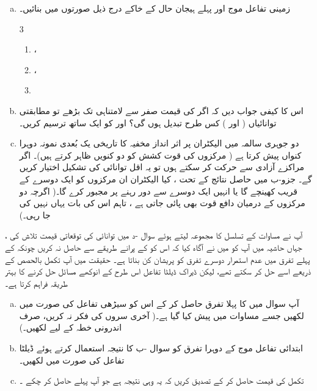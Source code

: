 \begin{enumerate}[a.]
\item
زمینی تفاعل موج  اور پہلے ہیجان حال  کے خاکے درج ذیل صورتوں  میں بنائیں۔
\begin{multicols}{3}
\begin{enumerate}[1.]
\item
 ،
 \item
 ،
\item 
 \end{enumerate}
 \end{multicols}
\item
 اس کا کیفی جواب دیں کہ اگر   کی قیمت صفر سے لامتناہی تک بڑھے تو   مطابقتی توانائیاں ( اور ) کس طرح تبدیل ہوں گی؟  اور  کو ایک ساتھ ترسیم کریں۔
\item
 دو جوہری سالمہ میں الیکٹران پر اثر انداز مخفیہ   کا تاریخی یک  بُعدی نمونہ دوہرا کنواں پیش کرتا ہے ( مرکزوں کی قوت کشش کو دو کنویں ظاہر کرتے ہیں)۔ اگر مراکزے آزادی سے حرکت کر سکتے ہوں تو یہ  اقل توانائی  کی تشکیل اختیار کریں گے۔ جزو-ب میں حاصل نتائج کے تحت ،  کیا الیکٹران ان مرکزوں کو ایک دوسرے کے قریب کھینچے گا یا انہیں ایک دوسرے سے دور رہنے پر مجبور کرے گا۔( اگرچہ دو مرکزوں کے درمیان  دافع قوت بھی پائی جاتی ہے ، تاہم اس کی بات یہاں نہیں کی جا رہی۔)
\end{enumerate}
آپ نے مساوات  کے تسلسل کا مجموعہ لیتے ہوئے سوال -د میں توانائی کی توقعاتی قیمت تلاش کی ، جہاں حاشیہ میں آپ کو میں نے آگاہ کیا کہ اس کو  کے پرانے طریقے  سے حاصل نہ کریں چونکہ  کے پہلے تفرق میں عدم استمرار دوسرے تفرق کو پریشان کن بناتا ہے۔ حقیقت میں آپ تکمل بالحصص کے ذریعے اسے حل کر سکتے تھے،  لیکن ڈیراک ڈیلٹا تفاعل اس طرح کے انوکھے  مسائل حل کرنے کا  بہتر طریقہ فراہم کرتا ہے۔
\begin{enumerate}[a.]
\item
 آپ سوال  میں   کا پہلا تفرق حاصل کر کے اس کو سیڑھی تفاعل  کی صورت میں لکھیں جسے مساوات  میں پیش کیا گیا ہے۔(  آخری سروں کی فکر نہ کریں، صرف اندرونی خطہ  کے لیے لکھیں۔)
\item
 ابتدائی  تفاعل   موج  کے دوہرا تفرق کو سوال -ب کا نتیجہ استعمال کرتے ہوئے ڈیلٹا تفاعل کی صورت میں لکھیں۔
\item
 تکمل    کی قیمت حاصل کر کے تصدیق کریں کہ یہ وہی نتیجہ ہے جو آپ پہلے حاصل کر چکے ۔
\end{enumerate}
